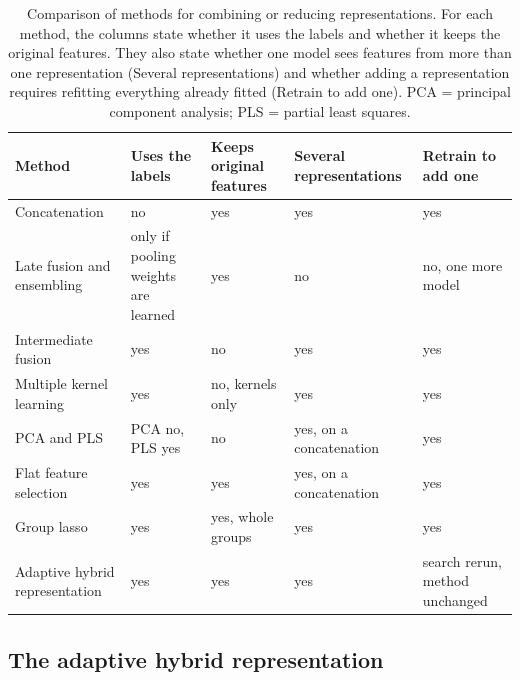 \begin{table}[htbp]
\centering
\small
\setlength{\tabcolsep}{3pt}
\caption[Methods for combining or reducing representations.]{Comparison of methods for combining or reducing representations. For each method, the columns state whether it uses the labels and whether it keeps the original features. They also state whether one model sees features from more than one representation (Several representations) and whether adding a representation requires refitting everything already fitted (Retrain to add one). PCA = principal component analysis; PLS = partial least squares.}
\label{tab:hybrid_alternatives}
\begin{adjustbox}{max width=\textwidth}
\begin{tabular}{P{4.2cm}P{2.3cm}P{2.1cm}P{2.3cm}P{2.6cm}}
\toprule
Method & Uses the labels & Keeps original features & Several representations & Retrain to add one \\
\midrule
Concatenation \citep{Stahlschmidt2022} & no & yes & yes & yes \\
Late fusion and ensembling \citep{Steyaert2023, Valsecchi2020} & only if pooling weights are learned & yes & no & no, one more model \\
Intermediate fusion \citep{Wang2021} & yes & no & yes & yes \\
Multiple kernel learning \citep{Gonen2011, Cichonska2018} & yes & no, kernels only & yes & yes \\
PCA and PLS \citep{Jolliffe2016, Wold2001} & PCA no, PLS yes & no & yes, on a concatenation & yes \\
Flat feature selection \citep{Guyon2003} & yes & yes & yes, on a concatenation & yes \\
Group lasso \citep{Yuan2006} & yes & yes, whole groups & yes & yes \\
Adaptive hybrid representation & yes & yes & yes & search rerun, method unchanged \\
\bottomrule
\end{tabular}
\end{adjustbox}
\end{table}
\subsection{The adaptive hybrid representation}

